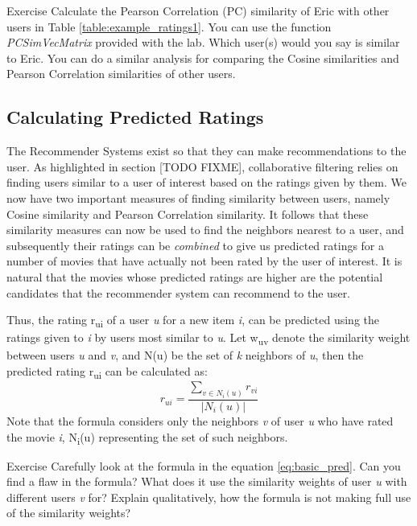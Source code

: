 \begin{myremark}{Exercise }
Calculate the Pearson Correlation (PC) similarity of Eric with other users in Table \ref{table:example_ratings1}. You can use the function \textit{PCSimVecMatrix} provided with the lab. Which user(s) would you say is similar to Eric. You can do a similar analysis for comparing the Cosine similarities and Pearson Correlation similarities of other users.
\end{myremark}

\subsection{Calculating Predicted Ratings}
The Recommender Systems exist so that they can make recommendations to the user. As highlighted in section [TODO FIXME], collaborative filtering relies on finding users similar to a user of interest based on the ratings given by them. We now have two important measures of finding similarity between users, namely Cosine similarity and Pearson Correlation similarity. It follows that these similarity measures can now be used to find the neighbors nearest to a user, and subsequently their ratings can be \textit{combined} to give us predicted ratings for a number of movies that have actually not been rated by the user of interest. It is natural that the movies whose predicted ratings are higher are the potential candidates that the recommender system can recommend to the user.

Thus, the rating r\textsubscript{ui} of a user \textit{u} for a new item \textit{i}, can be predicted using the ratings given to \textit{i} by users most similar to \textit{u}. Let w\textsubscript{uv} denote the similarity weight between users \textit{u} and \textit{v}, and N(u) be the set of \textit{k} neighbors of \textit{u}, then the predicted rating r\textsubscript{ui} can be calculated as:
\begin{equation} \label{eq:basic_pred}
r_{ui} = \frac
{\sum_{v \in{N_{i}(u)}}^{}{r_{vi}}}
{|N_{i}(u)|}
\end{equation}
Note that the formula considers only the neighbors \textit{v} of user \textit{u} who have rated the movie \textit{i}, N\textsubscript{i}(u) representing the set of such neighbors.

\begin{myremark}{Exercise }
Carefully look at the formula in the equation \ref{eq:basic_pred}. Can you find a flaw in the formula? What does it use the similarity weights of user \textit{u} with different users \textit{v} for? Explain qualitatively, how the formula is not making full use of the similarity weights?
\end{myremark}

